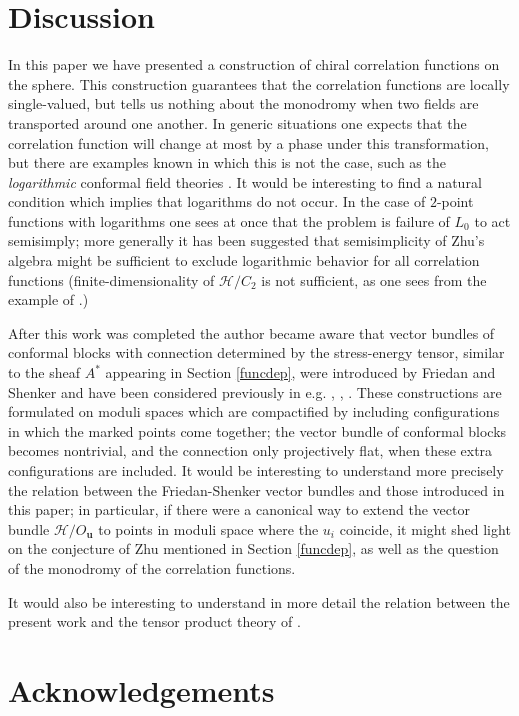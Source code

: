 \documentclass[a4paper,12pt]{article}
\newcommand{\uu}{{\mathbf u}}
\newcommand{\F}{{\mathcal H}}
\newcommand{\ti}[1]{\textit{#1}}
\begin{document}
\section{Discussion} \label{discussion}
In this paper we have presented a construction of chiral correlation functions on the sphere.  This
construction guarantees that the correlation functions are locally single-valued, but tells us nothing
about the monodromy when two fields are transported around one another.  In generic situations one expects that the
correlation function will change at most by a phase under this transformation, but there are examples known in which this
is not the case, such as the \ti{logarithmic} conformal field theories \cite{log}.  It would be interesting to find
a natural condition which implies that logarithms do not occur.  In the case of $2$-point functions with
logarithms one sees at once that the problem is failure of $L_0$ to act semisimply; more generally 
it has been suggested \cite{Gpriv} that semisimplicity of Zhu's algebra might be sufficient to exclude
logarithmic behavior for all correlation functions (finite-dimensionality of $\F / C_2$ is not sufficient, as one
sees \cite{Gpriv} from the example of \cite{Glog}.)

After this work was completed the author became aware that vector bundles of conformal blocks with connection 
determined by the stress-energy tensor, 
similar to the sheaf $A^*$ appearing in Section \ref{funcdep}, were introduced by Friedan and Shenker and
have been considered previously in e.g. \cite{FS}, \cite{Felder},
\cite{FS2}.  These constructions are formulated on moduli spaces which are compactified by including
configurations in which the marked points come together; the vector bundle of conformal blocks becomes
nontrivial, and the connection only projectively flat, when these extra configurations are included.
It would be interesting to understand more precisely the relation between the Friedan-Shenker vector bundles
and those introduced in this paper; in particular, if there were a canonical way to extend the vector bundle $\F / O_\uu$
to points in moduli space where the $u_i$ coincide, it might shed light on the conjecture of Zhu mentioned in Section \ref{funcdep},
as well as the question of the monodromy of the correlation functions.

It would also be interesting to understand in more detail the
relation between the present work and the tensor product theory
of \cite{HL}.


\section*{Acknowledgements} \label{ack}
\end{document}
